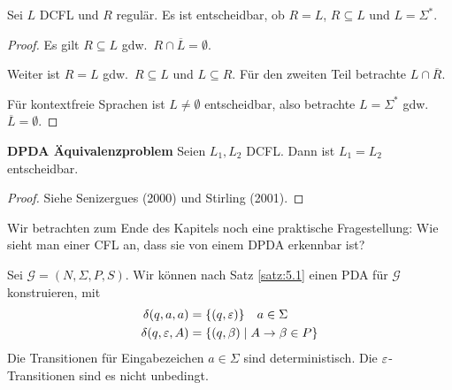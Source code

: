 \begin{Satz}
    Sei $L$ DCFL und $R$ regulär.
    Es ist entscheidbar, ob $R=L$, $R\subseteq L$ und $L=\Sigma^*$.
\end{Satz}
\begin{proof}
    Es gilt $R\subseteq L$ gdw.\ $R \cap \overline{L} = \emptyset$.
    
    Weiter ist $R = L$ gdw.\ $R\subseteq L$ und $L \subseteq R$. Für den zweiten Teil betrachte $L\cap \overline{R}$.
    
    Für kontextfreie Sprachen ist $L\ne \emptyset$ entscheidbar, also betrachte $L=\Sigma^*$ gdw.\ $\overline{L}=\emptyset$.
\end{proof}

\begin{Satz} \textbf{DPDA Äquivalenzproblem}
    Seien $L_1, L_2$ DCFL. Dann ist $L_1 = L_2$ entscheidbar.
\end{Satz}

\begin{proof}
    Siehe Senizergues (2000) und Stirling (2001).
\end{proof}

Wir betrachten zum Ende des Kapitels noch eine praktische Fragestellung: Wie sieht man einer CFL an, dass sie von einem DPDA erkennbar ist?

Sei $\mathcal{G} = (N, \Sigma, P, S)$.
Wir können nach Satz \ref{satz:5.1} einen PDA für $\mathcal{G}$ konstruieren, mit
\begin{align*}
  \delta(q, a, a) &= \{(q, \varepsilon)\} \quad a \in \Sigma \\
  \delta(q, \varepsilon, A) &= \{(q, \beta)  \mid A \to \beta \in P\}
\end{align*}
Die Transitionen für Eingabezeichen $a \in \Sigma$ sind deterministisch.
Die $\varepsilon$-Transitionen sind es nicht unbedingt.

